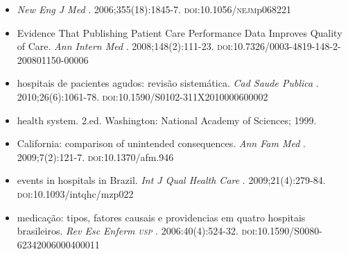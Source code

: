 \documentclass{article}
\begin{document}
\begin{itemize}
\item[%
8] %
\textit{New
            Eng J Med}
 . 2006;355(18):1845-7. \textsc{doi}:10.1056/\textsc{nejm}p068221  

\item[%
9] %
          Evidence That Publishing Patient Care Performance Data Improves Quality of Care.
\textit{Ann Intern Med}
 . 2008;148(2):111-23.
          \textsc{doi}:10.7326/0003-4819-148-2-200801150-00006  

\item[%
10] %
          hospitais de pacientes agudos: revisão sistemática. %
\textit{Cad Saude Publica}
 .
          2010;26(6):1061-78. \textsc{doi}:10.1590/S0102-311X2010000600002  

\item[%
11] %
          health system. 2.ed. Washington: National Academy of Sciences; 1999.  

\item[%
12] %
          California: comparison of unintended consequences. %
\textit{Ann Fam Med}
 .
          2009;7(2):121-7. \textsc{doi}:10.1370/afm.946  

\item[%
13] %
          events in hospitals in Brazil. %
\textit{Int J Qual Health Care}
 .
          2009;21(4):279-84. \textsc{doi}:10.1093/intqhc/mzp022  

\item[%
14] %
          medicação: tipos, fatores causais e providencias em quatro hospitais brasileiros.
\textit{Rev Esc Enferm \textsc{usp}}
 . 2006:40(4):524-32.
          \textsc{doi}:10.1590/S0080-62342006000400011  


\end{itemize}
\end{document}
